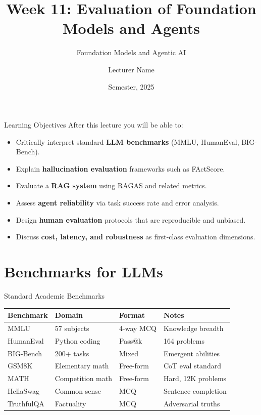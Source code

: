 \documentclass[aspectratio=169,10pt]{beamer}
\title{Week 11: Evaluation of Foundation Models and Agents}
\subtitle{Foundation Models and Agentic AI}
\author{Lecturer Name}
\institute{Holon Institute of Technology (HIT)}
\date{Semester, 2025}
\begin{document}
\begin{frame}
  \titlepage
\end{frame}

\begin{frame}{Learning Objectives}
  After this lecture you will be able to:
  \begin{itemize}
    \item Critically interpret standard \textbf{LLM benchmarks} (MMLU, HumanEval, BIG-Bench).
    \item Explain \textbf{hallucination evaluation} frameworks such as FActScore.
    \item Evaluate a \textbf{RAG system} using RAGAS and related metrics.
    \item Assess \textbf{agent reliability} via task success rate and error analysis.
    \item Design \textbf{human evaluation} protocols that are reproducible and unbiased.
    \item Discuss \textbf{cost, latency, and robustness} as first-class evaluation dimensions.
  \end{itemize}
\end{frame}

\section{Benchmarks for LLMs}

\begin{frame}{Standard Academic Benchmarks}
  \begin{center}
  \begin{tabular}{llll}
    \toprule
    \textbf{Benchmark} & \textbf{Domain} & \textbf{Format} & \textbf{Notes} \\
    \midrule
    MMLU~\cite{hendrycks2020mmlu} & 57 subjects & 4-way MCQ & Knowledge breadth \\
    HumanEval~\cite{chen2021humaneval} & Python coding & Pass@k & 164 problems \\
    BIG-Bench~\cite{srivastava2022bigbench} & 200+ tasks & Mixed & Emergent abilities \\
    GSM8K & Elementary math & Free-form & CoT eval standard \\
    MATH & Competition math & Free-form & Hard, 12K problems \\
    HellaSwag & Common sense & MCQ & Sentence completion \\
    TruthfulQA & Factuality & MCQ & Adversarial truths \\
    \bottomrule
  \end{tabular}
  \end{center}
\end{frame}
\end{document}
